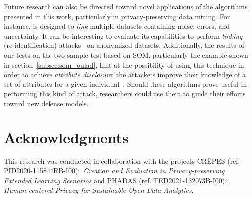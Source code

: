 Future research can also be directed toward novel applications of the algorithms presented in this work,
particularly in privacy-preserving data mining.
For instance, \PresQ is designed to \emph{link} multiple datasets containing noise, errors, and uncertainty.
It can be interesting to evaluate its capabilities to perform \emph{linking} (re-identification)
attacks~\cite{Chen2009} on anonymized datasets. Additionally, the results of our tests on the
two-sample test based on \gls{SOM}, particularly the example shown in section~\ref{subsec:som_oulad},
 hint at the possibility of using this technique in order to achieve \emph{attribute disclosure}:
 the attackers improve their knowledge of a set of attributes for a given individual~\cite{ENISA2015}.
Should these algorithms prove useful in performing this kind of attack, researchers could
use them to guide their efforts toward new defense models.


\section*{Acknowledgments}

This research was conducted in collaboration with the projects
CR\^EPES (ref. PID2020-115844RB-I00): \textit{Creation and Evaluation in Privacy-preserving Extended Learning Scenarios}
and PHADAS (ref. TED2021-132073B-I00): \textit{Human-centered Privacy for Sustainable Open Data Analytics}.
